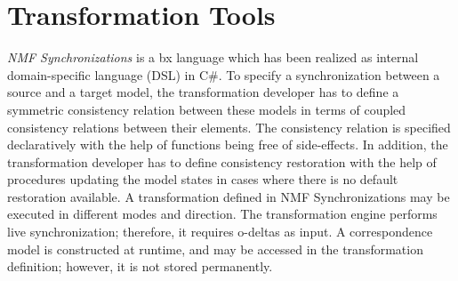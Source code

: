 \section{Transformation Tools}
\label{sec:TransformationTools}




\emph{NMF Synchronizations} \cite{SoSyM2017-Hinkel} is a bx language which has been realized as internal domain-specific language (DSL) in C\#. To specify a synchronization between a source and a target model, the transformation developer has to define a symmetric consistency relation between these models in terms of coupled consistency relations between their elements. The consistency relation is specified declaratively with the help of functions being free of side-effects. In addition, the transformation developer has to define consistency restoration with the help of procedures updating the model states in cases where there is no default restoration available. A transformation defined in NMF Synchronizations may be executed in different modes and direction. The transformation engine performs live synchronization; therefore, it requires o-deltas as input. A correspondence model is constructed at runtime, and may be accessed in the transformation definition; however, it is not stored permanently.